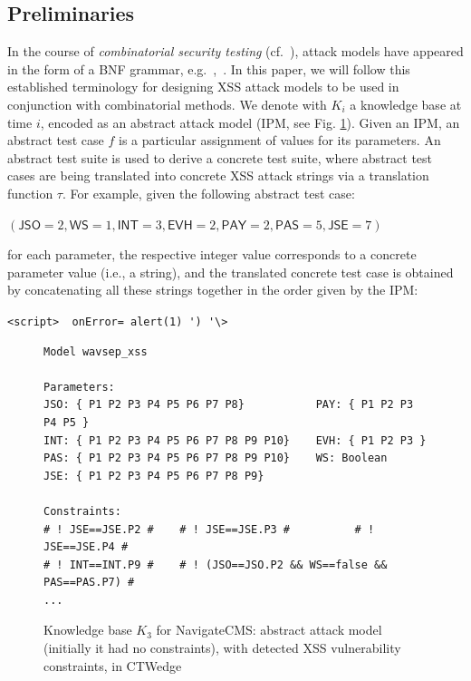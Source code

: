 \begin{tikzborder}{\cite{Gargantini16:validation}}
\begin{tikzborder}{\cite{gargantini_combinatorial_2017}}
\subsection{Preliminaries}\label{sec:xssbasic}
\begin{tikzborder}{\cite{garn2019}}
In the course of \emph{combinatorial security testing} (cf.~\cite{SKVKS2016:IEEEComp}), attack models have appeared in the
form of a BNF grammar, e.g.~\cite{bozic2015attack},~\cite{wotawa_combinatorial_2016}. 
In this paper, we will follow this established terminology for designing XSS attack models to be used in conjunction with combinatorial methods.  
We denote with $K_{i}$ a knowledge base at time $i$, encoded as an abstract attack model (IPM, see Fig. \ref{fig:model1}).
Given an IPM, an abstract test case $f$ is a particular assignment of values for its parameters. 
An abstract test suite is used to derive a concrete test suite, where abstract test cases are being translated into concrete XSS attack strings via a translation function $\tau$.
For example, given the following abstract test case:
\be

\begin{center}
$(\textsf{JSO}=2,\textsf{WS}=1,\textsf{INT}=3,\textsf{EVH}=2,\textsf{PAY}=2,\textsf{PAS}=5,\textsf{JSE}=7)$
\end{center} 

\bb for each parameter, the respective integer value corresponds to a concrete parameter value (i.e., a string), and the translated concrete test case is obtained by concatenating all these strings together in the order given by the IPM: 
\be

\begin{center}
\lstinline[basicstyle=\ttfamily]!<script>  onError= alert(1) ') '\>!
\end{center}

\begin{figure}[H]
\begin{lstlisting}[basicstyle=\linespread{1}\sffamily\scriptsize,frame = single,morekeywords={Model,Parameters,Constraints,false,Boolean}]
Model wavsep_xss

Parameters:
JSO: { P1 P2 P3 P4 P5 P6 P7 P8}           PAY: { P1 P2 P3 P4 P5 }    
INT: { P1 P2 P3 P4 P5 P6 P7 P8 P9 P10}    EVH: { P1 P2 P3 }
PAS: { P1 P2 P3 P4 P5 P6 P7 P8 P9 P10}    WS: Boolean
JSE: { P1 P2 P3 P4 P5 P6 P7 P8 P9}

Constraints:
# ! JSE==JSE.P2 #    # ! JSE==JSE.P3 #          # ! JSE==JSE.P4 #
# ! INT==INT.P9 #    # ! (JSO==JSO.P2 && WS==false && PAS==PAS.P7) #
...
\end{lstlisting}
\caption{Knowledge base $K_3$ for NavigateCMS: abstract attack model (initially it had no constraints), with detected XSS vulnerability constraints, in CTWedge}\label{fig:model1}
\end{figure}


\end{tikzborder}
\end{tikzborder}
\end{tikzborder}
